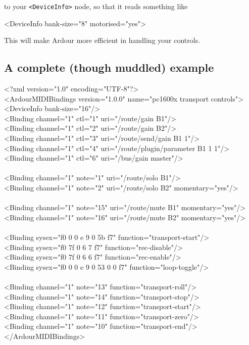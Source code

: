 \documentclass[10pt,a4paper]{book}
\begin{document}
to your \texttt{<DeviceInfo>} node, so that it reads something like

\begin{listing}
<DeviceInfo bank-size="8" motorised="yes">
\end{listing}

This will make Ardour more efficient in handling your controls.

\subsection{A complete (though muddled) example}

\begin{listing}
<?xml version="1.0" encoding="UTF-8"?>\\
<ArdourMIDIBindings version="1.0.0" name="pc1600x transport controls">\\
<DeviceInfo bank-size="16"/>\\
<Binding channel="1" ctl="1"   uri="/route/gain B1"/>\\
<Binding channel="1" ctl="2"   uri="/route/gain B2"/>\\
<Binding channel="1" ctl="3"   uri="/route/send/gain B1 1"/>\\
<Binding channel="1" ctl="4"   uri="/route/plugin/parameter B1 1 1"/>\\
<Binding channel="1" ctl="6"   uri="/bus/gain master"/>\\
\\
<Binding channel="1" note="1"  uri="/route/solo B1"/>\\
<Binding channel="1" note="2"  uri="/route/solo B2" momentary="yes"/>\\
\\
<Binding channel="1" note="15"  uri="/route/mute B1" momentary="yes"/>\\
<Binding channel="1" note="16"  uri="/route/mute B2" momentary="yes"/>\\
\\
<Binding sysex="f0 0 0 e 9 0 5b f7" function="transport-start"/>\\
<Binding sysex="f0 7f 0 6 7 f7" function="rec-disable"/>\\
<Binding sysex="f0 7f 0 6 6 f7" function="rec-enable"/>\\
<Binding sysex="f0 0 0 e 9 0 53 0 0 f7" function="loop-toggle"/>\\
\\
<Binding channel="1" note="13" function="transport-roll"/>\\
<Binding channel="1" note="14" function="transport-stop"/>\\
<Binding channel="1" note="12" function="transport-start"/>\\
<Binding channel="1" note="11" function="transport-zero"/>\\
<Binding channel="1" note="10" function="transport-end"/>\\
</ArdourMIDIBindings>\\
\end{listing}
\end{document}
